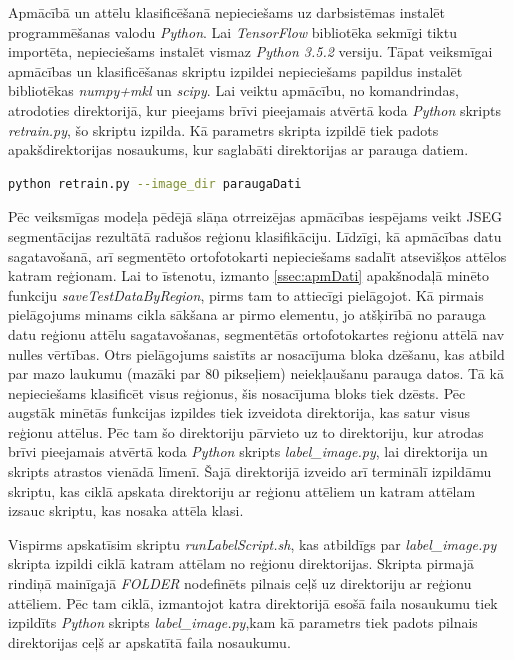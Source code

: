 \documentclass[12pt,paper=a4]{report}
\begin{document}
Apmācībā un attēlu klasificēšanā nepieciešams uz darbsistēmas instalēt programmēšanas valodu \textit{Python}. Lai \textit{TensorFlow} bibliotēka sekmīgi tiktu importēta, nepieciešams instalēt vismaz  \textit{Python 3.5.2} versiju. Tāpat veiksmīgai apmācības un klasificēšanas skriptu izpildei nepieciešams papildus instalēt bibliotēkas \textit{numpy+mkl} un \textit{scipy}. Lai veiktu apmācību, no komandrindas, atrodoties direktorijā, kur pieejams brīvi pieejamais atvērtā koda \textit{Python} skripts \textit{retrain.py}, šo skriptu izpilda. Kā parametrs skripta izpildē tiek padots apakšdirektorijas nosaukums, kur saglabāti direktorijas ar parauga datiem.
\begin{lstlisting}[language=bash]
python retrain.py --image_dir paraugaDati
\end{lstlisting}\par
Pēc veiksmīgas modeļa pēdējā slāņa otrreizējas apmācības iespējams veikt JSEG segmentācijas rezultātā radušos reģionu klasifikāciju. Līdzīgi, kā apmācības datu sagatavošanā, arī segmentēto ortofotokarti nepieciešams sadalīt atsevišķos attēlos katram reģionam. Lai to īstenotu, izmanto \ref{ssec:apmDati} apakšnodaļā minēto funkciju \textit{saveTestDataByRegion}, pirms tam to attiecīgi pielāgojot. Kā pirmais pielāgojums minams cikla sākšana ar pirmo elementu, jo atšķirībā no parauga datu reģionu attēlu sagatavošanas, segmentētās ortofotokartes reģionu attēlā nav nulles vērtības. Otrs pielāgojums saistīts ar nosacījuma bloka dzēšanu, kas atbild par mazo laukumu (mazāki par 80 pikseļiem) neiekļaušanu parauga datos. Tā kā nepieciešams klasificēt visus reģionus, šis nosacījuma bloks tiek dzēsts. Pēc augstāk minētās funkcijas izpildes tiek izveidota direktorija, kas satur visus reģionu attēlus. Pēc tam šo direktoriju pārvieto uz to direktoriju, kur atrodas brīvi pieejamais atvērtā koda \textit{Python} skripts \textit{label_image.py}, lai direktorija un skripts atrastos vienādā līmenī. Šajā direktorijā izveido arī terminālī izpildāmu skriptu, kas ciklā apskata direktoriju ar reģionu attēliem un katram attēlam izsauc skriptu, kas nosaka attēla klasi.\par
Vispirms apskatīsim skriptu \textit{runLabelScript.sh}, kas atbildīgs par \textit{label_image.py} skripta izpildi ciklā katram attēlam no reģionu direktorijas. Skripta pirmajā rindiņā mainīgajā \textit{FOLDER} nodefinēts pilnais ceļš uz direktoriju ar reģionu attēliem. Pēc tam ciklā, izmantojot katra direktorijā esošā faila nosaukumu tiek izpildīts \textit{Python} skripts \textit{label_image.py},kam kā parametrs tiek padots pilnais direktorijas ceļš ar apskatītā faila nosaukumu. 
\end{document}
